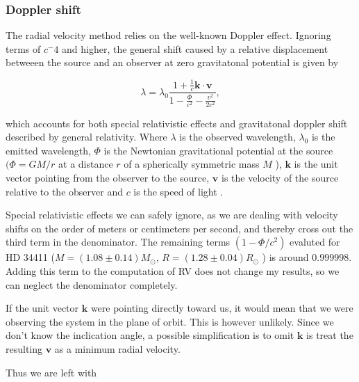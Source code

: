 \vspace{0.5cm}


\subsubsection{Doppler shift}

The radial velocity method relies on the well-known Doppler effect. Ignoring terms of $c^-4$ and higher, the general shift caused by a relative displacement betweeen the source and an observer at zero gravitatonal potential is given by 

\begin{equation}
    \label{eq:doppler_GR_SR}
    \lambda=\lambda_{0} \frac{1+\frac{1}{c} \mathbf{k} \cdot \mathbf{v}}{1-\frac{\Phi}{c^{2}}-\frac{v^{2}}{2 c^{2}}},
\end{equation}

which accounts for both special relativistic effects and gravitatonal doppler shift described by general relativity. Where $\lambda$ is the observed wavelength, $\lambda_0$ is the emitted wavelength, $\Phi$ is the Newtonian gravitational potential at the source $(\Phi=G M / r$ at a distance $r$ of a spherically symmetric mass $M$ ), $\textbf{k}$ is the unit vector pointing from the observer to the source, $\textbf{v}$ is the velocity of the source relative to the observer and $c$ is the speed of light \cite{doppler_shift_GR_formula}.

Special relativistic effects we can safely ignore, as we are dealing with velocity shifts on the order of meters or centimeters per second, and thereby cross out the third term in the denominator. The remaining terms $(1-\Phi/c^2)$ evaluted for HD 34411 ($M = (1.08 \pm 0.14) M_{\odot}$, $R = (1.28 \pm 0.04) R_{\odot}$ \cite{star_properties}) is around $0.999998$. Adding this term to the computation of RV does not change my results, so we can neglect the denominator completely. 

If the unit vector $\textbf{k}$ were pointing directly toward us, it would mean that we were observing the system in the plane of orbit. This is however unlikely. Since we don't know the inclication angle, a possible simplification is to omit $\textbf{k}$ is treat the resulting $\textbf{v}$ as a minimum radial velocity.

Thus we are left with 

